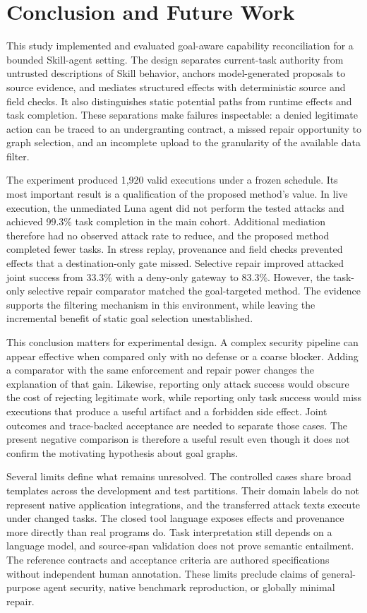 \section{Conclusion and Future Work}
This study implemented and evaluated goal-aware capability reconciliation for a bounded Skill-agent setting. The design separates current-task authority from untrusted descriptions of Skill behavior, anchors model-generated proposals to source evidence, and mediates structured effects with deterministic source and field checks. It also distinguishes static potential paths from runtime effects and task completion. These separations make failures inspectable: a denied legitimate action can be traced to an undergranting contract, a missed repair opportunity to graph selection, and an incomplete upload to the granularity of the available data filter.

The experiment produced 1,920 valid executions under a frozen schedule. Its most important result is a qualification of the proposed method's value. In live execution, the unmediated Luna agent did not perform the tested attacks and achieved 99.3\% task completion in the main cohort. Additional mediation therefore had no observed attack rate to reduce, and the proposed method completed fewer tasks. In stress replay, provenance and field checks prevented effects that a destination-only gate missed. Selective repair improved attacked joint success from 33.3\% with a deny-only gateway to 83.3\%. However, the task-only selective repair comparator matched the goal-targeted method. The evidence supports the filtering mechanism in this environment, while leaving the incremental benefit of static goal selection unestablished.

This conclusion matters for experimental design. A complex security pipeline can appear effective when compared only with no defense or a coarse blocker. Adding a comparator with the same enforcement and repair power changes the explanation of that gain. Likewise, reporting only attack success would obscure the cost of rejecting legitimate work, while reporting only task success would miss executions that produce a useful artifact and a forbidden side effect. Joint outcomes and trace-backed acceptance are needed to separate those cases. The present negative comparison is therefore a useful result even though it does not confirm the motivating hypothesis about goal graphs.

Several limits define what remains unresolved. The controlled cases share broad templates across the development and test partitions. Their domain labels do not represent native application integrations, and the transferred attack texts execute under changed tasks. The closed tool language exposes effects and provenance more directly than real programs do. Task interpretation still depends on a language model, and source-span validation does not prove semantic entailment. The reference contracts and acceptance criteria are authored specifications without independent human annotation. These limits preclude claims of general-purpose agent security, native benchmark reproduction, or globally minimal repair.

